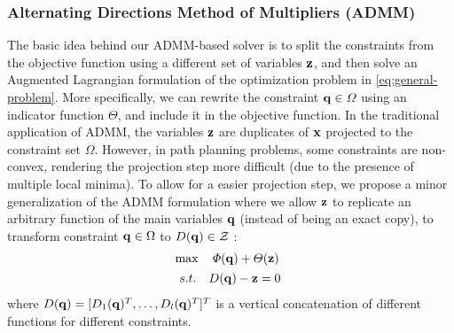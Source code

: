 \documentclass[journal]{IEEEtran}  %
\def\sZ{\mathcal{Z}}
\begin{document}
\subsubsection{Alternating Directions Method of Multipliers (ADMM)}\label{chapter:ADMM review}
The basic idea behind our ADMM-based solver \cite{zyang} is to split the constraints from the objective function using a different set of variables $\mathbf{z}$, and then solve an Augmented Lagrangian formulation of the optimization problem in \eqref{eq:general-problem}.
More specifically, we can rewrite the constraint $\mathbf{q}\in\varOmega$ using an indicator function $\varTheta$, and include it in the objective function. In the traditional application of ADMM, the variables $\mathbf{z}$ are duplicates of $\mathbf{x}$ projected to the constraint set $\Omega$. However, in path planning problems, some constraints are non-convex, rendering the projection step more difficult (due to the presence of multiple local minima).
To allow for a easier projection step, we propose a minor generalization of the ADMM formulation where we allow $\mathbf{z}$ to replicate an arbitrary function of the main variables $\mathbf{q}$ (instead of being an exact copy), to transform constraint $\mathbf{q}\in\Omega$ to $D(\vq) \in \sZ$ : 
\begin{equation}\label{eq:ADMMSetConstraint_modified}
	\begin{aligned}
		&\max\quad \varPhi(\vq)+\varTheta(\vz) \\
		& \begin{array}{r@{\quad}c}
			s.t.& D(\vq)-\vz=0
		\end{array} 
	\end{aligned}
\end{equation}
where $D(\mathbf{q})= [D_1(\mathbf{q})^T,\dots,D_l(\mathbf{q})^T]^T$ is a vertical concatenation of different functions for different constraints.
\end{document}
